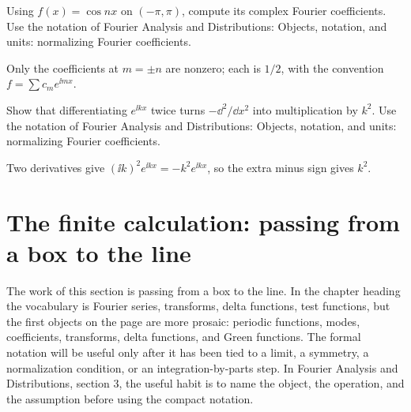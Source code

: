 \begin{exercise}
Using \(f(x)=\cos nx\) on \((-\pi,\pi)\), compute its complex Fourier coefficients.  Use the notation of Fourier Analysis and Distributions: Objects, notation, and units: normalizing Fourier coefficients.
\begin{answer}
Only the coefficients at \(m=\pm n\) are nonzero; each is \(1/2\), with the convention \(f=\sum c_me^{\ii mx}\).
\end{answer}
\end{exercise}

\begin{exercise}
Show that differentiating \(e^{\ii kx}\) twice turns \(-\dd^2/\dd x^2\) into multiplication by \(k^2\).  Use the notation of Fourier Analysis and Distributions: Objects, notation, and units: normalizing Fourier coefficients.
\begin{answer}
Two derivatives give \((\ii k)^2e^{\ii kx}=-k^2e^{\ii kx}\), so the extra minus sign gives \(k^2\).
\end{answer}
\end{exercise}



\section{The finite calculation: passing from a box to the line}













The work of this section is passing from a box to the line.  In the chapter heading the vocabulary is Fourier series, transforms, delta functions, test functions, but the first objects on the page are more prosaic: periodic functions, modes, coefficients, transforms, delta functions, and Green functions.  The formal notation will be useful only after it has been tied to a limit, a symmetry, a normalization condition, or an integration-by-parts step.  In Fourier Analysis and Distributions, section 3, the useful habit is to name the object, the operation, and the assumption before using the compact notation.

